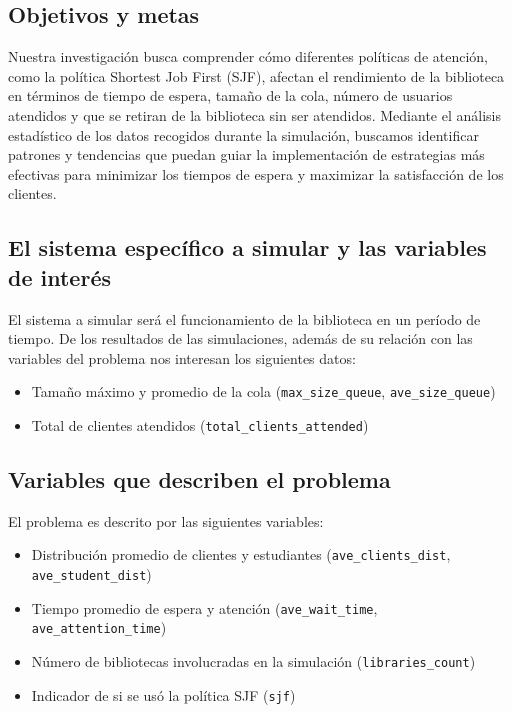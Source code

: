 \documentclass[10pt,twocolumn]{article}
\begin{document}
\subsection{Objetivos y metas}
Nuestra investigación busca comprender cómo diferentes políticas de atención, como la política Shortest Job First (SJF), afectan el rendimiento de la biblioteca en términos de tiempo de espera, tamaño de la cola, número de usuarios atendidos y que se retiran de la biblioteca sin ser atendidos. Mediante el análisis estadístico de los datos recogidos durante la simulación, buscamos identificar patrones y tendencias que puedan guiar la implementación de estrategias más efectivas para minimizar los tiempos de espera y maximizar la satisfacción de los clientes.

\subsection{El sistema específico a simular y las variables de interés}
El sistema a simular será el funcionamiento de la biblioteca en un período de tiempo. De los resultados de las simulaciones, además de su relación con las variables del problema nos interesan los siguientes datos:
\begin{itemize}
	\item Tamaño máximo y promedio de la cola (\texttt{max\_size\_queue}, \texttt{ave\_size\_queue})
	\item Total de clientes atendidos (\texttt{total\_clients\_attended})
\end{itemize}

\subsection{Variables que describen el problema}
El problema es descrito por las siguientes variables:
\begin{itemize}
	\item Distribución promedio de clientes y estudiantes (\texttt{ave\_clients\_dist}, \texttt{ave\_student\_dist})
	\item Tiempo promedio de espera y atención (\texttt{ave\_wait\_time}, \texttt{ave\_attention\_time})
	\item Número de bibliotecas involucradas en la simulación (\texttt{libraries\_count})
	\item Indicador de si se usó la política SJF (\texttt{sjf})
\end{itemize}
\end{document}
